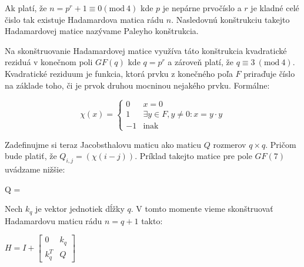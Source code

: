 \begin{theorem}
\label{th:hm_paley}
Ak platí, že $n = p^r + 1 \equiv 0 (\textrm{mod}\ 4)$ kde $p$ je nepárne prvočíslo a $r$ je kladné celé čislo tak existuje Hadamardova matica rádu $n$.
Nasledovnú konštrukciu takejto Hadamardovej matice nazývame Paleyho konštrukcia.
\end{theorem}
\begin{construction}

Na skonštruovanie Hadamardovej matice využíva táto konštrukcia kvadratické reziduá v konečnom poli $GF(q)$ kde $q = p^r$ a zároveň platí, že
$q \equiv 3\ (\textrm{mod}\ 4)$. Kvadratické reziduum je funkcia, ktorá prvku z konečného poľa $F$ priraďuje číslo na základe toho, či je prvok
druhou mocninou nejakého prvku. Formálne:

\begin{center}
\begin{equation*}
    \chi(x) = \begin{cases}
               0               & x = 0\\
               1               & \exists y \in F, y \neq 0: x = y \cdot y\\
               -1              & \text{inak}
           \end{cases}
\end{equation*}
\end{center}

Zadefinujme si teraz Jacobsthalovu maticu ako maticu $Q$ rozmerov $q\times q$. Pričom bude platiť, že $Q_{i,j} = (\chi(i-j))$.
Príklad takejto matice pre pole $GF(7)$ uvádzame nižšie:

\begin{center}
Q = 
\end{center}

Nech $k_q$ je vektor jednotiek dĺžky $q$. V tomto momente vieme skonštruovať Hadamardovu maticu rádu $n = q+1$ takto:


\begin{center}
$H = I + \begin{bmatrix}
0 & k_q \\
k_q^T & Q
\end{bmatrix}$
\end{center}

\end{construction}


